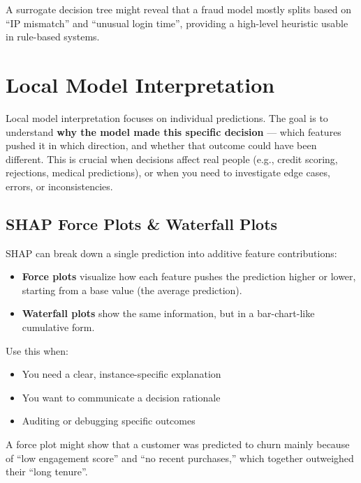 \documentclass[12pt,openany, draft]{book}
\begin{document}
\begin{examplebox}
A surrogate decision tree might reveal that a fraud model mostly splits based on ``IP mismatch'' and ``unusual login time'', providing a high-level heuristic usable in rule-based systems.
\end{examplebox}




\chapter{Local Model Interpretation}

Local model interpretation focuses on individual predictions. The goal is to understand \textbf{why the model made this specific decision} — which features pushed it in which direction, and whether that outcome could have been different. This is crucial when decisions affect real people (e.g., credit scoring, rejections, medical predictions), or when you need to investigate edge cases, errors, or inconsistencies.



\section{SHAP Force Plots \& Waterfall Plots}

SHAP can break down a single prediction into additive feature contributions:
\begin{itemize}
  \item \textbf{Force plots} visualize how each feature pushes the prediction higher or lower, starting from a base value (the average prediction).
  \item \textbf{Waterfall plots} show the same information, but in a bar-chart-like cumulative form.
\end{itemize}

Use this when:
\begin{itemize}
  \item You need a clear, instance-specific explanation
  \item You want to communicate a decision rationale
  \item Auditing or debugging specific outcomes
\end{itemize}

\begin{examplebox}
A force plot might show that a customer was predicted to churn mainly because of ``low engagement score'' and ``no recent purchases,'' which together outweighed their ``long tenure''.
\end{examplebox}
\end{document}
